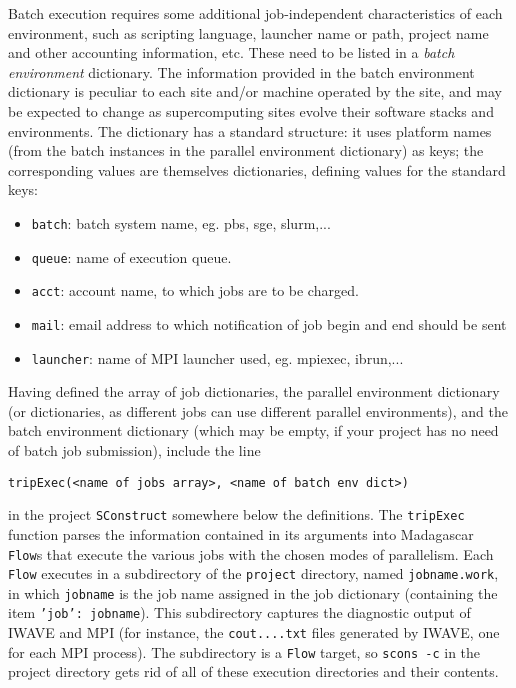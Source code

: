 Batch execution requires some additional job-independent characteristics of each environment, such as scripting language, launcher name or path, project name and other accounting information, etc. These need to be listed in a {\em batch environment} dictionary. The information provided in the batch environment dictionary is peculiar to each site and/or machine operated by the site, and may be expected to change as supercomputing sites evolve their software stacks and environments. The dictionary has a standard structure: it uses platform names (from the batch instances in the parallel environment dictionary) as keys; the corresponding values are themselves dictionaries, defining values for the standard keys:
\begin{itemize}
\item {\tt batch}: batch system name, eg. pbs, sge, slurm,...
\item {\tt queue}: name of execution queue.
\item {\tt acct}: account name, to which jobs are to be charged.
\item {\tt mail}: email address to which notification of job begin and end should be sent
\item {\tt launcher}: name of MPI launcher used, eg. mpiexec, ibrun,...
\end{itemize}

Having defined the array of job dictionaries, the parallel environment dictionary (or dictionaries, as different jobs can use different parallel environments), and the batch environment dictionary (which may be empty, if your project has no need of batch job submission), include the line
\begin{verbatim}
tripExec(<name of jobs array>, <name of batch env dict>)
\end{verbatim}
in the project {\tt SConstruct} somewhere below the definitions. The {\tt tripExec} function parses the information contained in its arguments into Madagascar {\tt Flow}s that execute the various jobs with the chosen modes of parallelism. Each {\tt Flow} executes in a subdirectory of the {\tt project} directory, named {\tt jobname.work}, in which {\tt jobname} is the job name assigned in the job dictionary (containing the item {\tt 'job': jobname}). This subdirectory captures the diagnostic output of IWAVE and MPI (for instance, the {\tt cout....txt} files generated by IWAVE, one for each MPI process). The subdirectory is a {\tt Flow} target, so {\tt scons -c} in the project directory gets rid of all of these execution directories and their contents.

